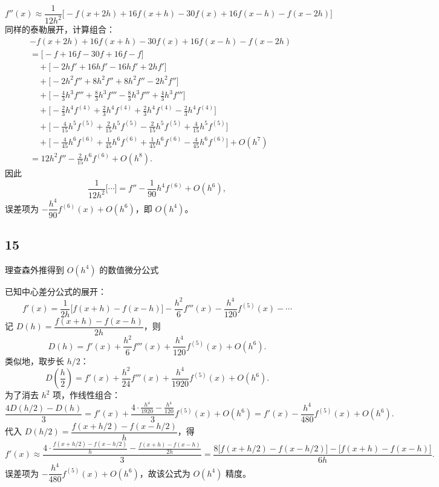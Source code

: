 \documentclass{article}
\begin{document}
\[
f''(x) \approx \frac{1}{12h^2}\bigl[-f(x+2h) + 16f(x+h) - 30f(x) + 16f(x-h) - f(x-2h)\bigr]
\]
同样的泰勒展开，计算组合：
\[
\begin{aligned}
&-f(x+2h) + 16f(x+h) - 30f(x) + 16f(x-h) - f(x-2h) \\
&= \bigl[-f + 16f -30f +16f -f\bigr] \\
&\quad + \bigl[-2h f' + 16h f' -16h f' + 2h f'\bigr] \\
&\quad + \bigl[-2h^2 f'' + 8h^2 f'' + 8h^2 f'' -2h^2 f''\bigr] \\
&\quad + \bigl[-\frac{4}{3}h^3 f''' + \frac{8}{3}h^3 f''' - \frac{8}{3}h^3 f''' + \frac{4}{3}h^3 f'''\bigr] \\
&\quad + \bigl[-\frac{2}{3}h^4 f^{(4)} + \frac{2}{3}h^4 f^{(4)} + \frac{2}{3}h^4 f^{(4)} - \frac{2}{3}h^4 f^{(4)}\bigr] \\
&\quad + \bigl[-\frac{4}{15}h^5 f^{(5)} + \frac{2}{15}h^5 f^{(5)} - \frac{2}{15}h^5 f^{(5)} + \frac{4}{15}h^5 f^{(5)}\bigr] \\
&\quad + \bigl[-\frac{4}{45}h^6 f^{(6)} + \frac{1}{45}h^6 f^{(6)} + \frac{1}{45}h^6 f^{(6)} - \frac{4}{45}h^6 f^{(6)}\bigr] + O(h^7) \\
&= 12h^2 f'' - \frac{2}{15}h^6 f^{(6)} + O(h^8).
\end{aligned}
\]
因此
\[
\frac{1}{12h^2}\bigl[\cdots\bigr] = f'' - \frac{1}{90}h^4 f^{(6)} + O(h^6),
\]
误差项为 \(-\dfrac{h^4}{90}f^{(6)}(x)+O(h^6)\)，即 \(O(h^4)\)。

\subsection*{15}

理查森外推得到 \(O(h^4)\) 的数值微分公式

已知中心差分公式的展开：
\[
f'(x) = \frac{1}{2h}\bigl[f(x+h)-f(x-h)\bigr] - \frac{h^2}{6}f'''(x) - \frac{h^4}{120}f^{(5)}(x) - \cdots
\]
记 \(D(h) = \dfrac{f(x+h)-f(x-h)}{2h}\)，则
\[
D(h) = f'(x) + \frac{h^2}{6}f'''(x) + \frac{h^4}{120}f^{(5)}(x) + O(h^6).
\]
类似地，取步长 \(h/2\)：
\[
D\left(\frac{h}{2}\right) = f'(x) + \frac{h^2}{24}f'''(x) + \frac{h^4}{1920}f^{(5)}(x) + O(h^6).
\]
为了消去 \(h^2\) 项，作线性组合：
\[
\frac{4D(h/2) - D(h)}{3} = f'(x) + \frac{4\cdot\frac{h^4}{1920} - \frac{h^4}{120}}{3} f^{(5)}(x) + O(h^6) = f'(x) - \frac{h^4}{480}f^{(5)}(x) + O(h^6).
\]
代入 \(D(h/2) = \dfrac{f(x+h/2)-f(x-h/2)}{h}\)，得
\[
f'(x) \approx \frac{4\cdot\frac{f(x+h/2)-f(x-h/2)}{h} - \frac{f(x+h)-f(x-h)}{2h}}{3} = \frac{8\bigl[f(x+h/2)-f(x-h/2)\bigr] - \bigl[f(x+h)-f(x-h)\bigr]}{6h}.
\]
误差项为 \(-\dfrac{h^4}{480}f^{(5)}(x) + O(h^6)\)，故该公式为 \(O(h^4)\) 精度。
\end{document}
